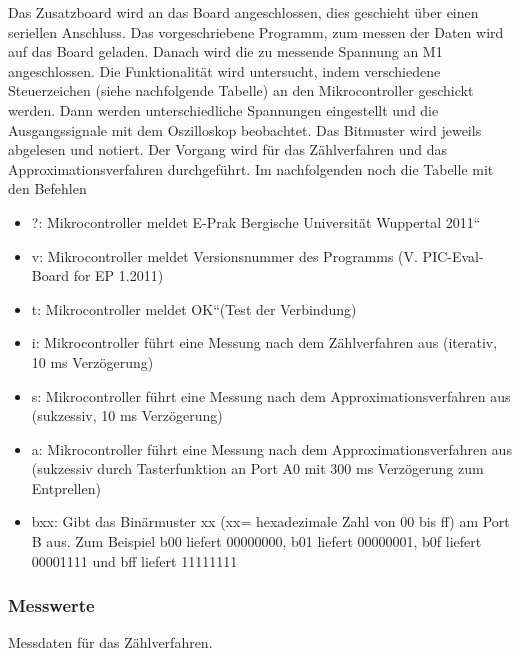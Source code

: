 \documentclass[12pt,a4paper]{article}
\begin{document}
Das Zusatzboard wird an das Board angeschlossen, dies geschieht über einen seriellen Anschluss. Das vorgeschriebene Programm, zum messen der Daten wird auf das Board geladen. Danach wird die zu messende Spannung an M1 angeschlossen. Die Funktionalität wird untersucht, indem verschiedene Steuerzeichen (siehe nachfolgende Tabelle) an den Mikrocontroller geschickt werden. Dann werden unterschiedliche Spannungen eingestellt und die Ausgangssignale mit dem Oszilloskop beobachtet. Das Bitmuster wird jeweils abgelesen und notiert. Der Vorgang wird für das Zählverfahren und das Approximationsverfahren durchgeführt. Im nachfolgenden noch die Tabelle mit den Befehlen

\begin{itemize}
\item	?: Mikrocontroller meldet E-Prak Bergische Universität Wuppertal 2011“

\item	v: Mikrocontroller meldet Versionsnummer des Programms (V. PIC-Eval-Board for EP 1.2011)

\item	t: Mikrocontroller meldet OK“(Test der Verbindung)

\item	i: Mikrocontroller führt eine Messung nach dem Zählverfahren aus (iterativ, 10 ms Verzögerung)

\item	s: Mikrocontroller führt eine Messung nach dem Approximationsverfahren aus (sukzessiv, 10 ms Verzögerung)

\item	a: Mikrocontroller führt eine Messung nach dem Approximationsverfahren aus (sukzessiv durch Tasterfunktion an Port A0 mit 300 ms Verzögerung zum Entprellen)

\item	bxx: Gibt das Binärmuster xx (xx= hexadezimale Zahl von 00 bis ff) am Port B aus. Zum Beispiel b00 liefert 00000000, b01 liefert 00000001, b0f liefert 00001111 und bff liefert 11111111

\end{itemize}

\subsubsection*{Messwerte}

Messdaten für das Zählverfahren.
\end{document}
